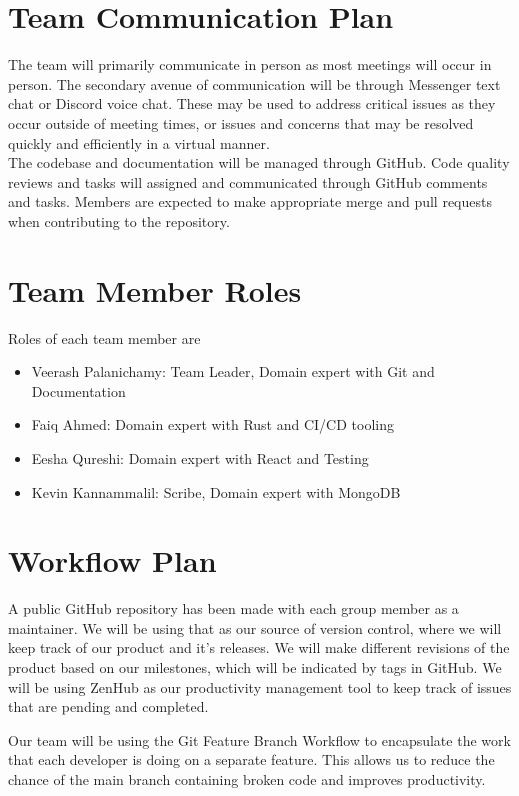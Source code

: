 \documentclass{article}
\begin{document}
\section{Team Communication Plan}

	The team will primarily communicate in person as most meetings will occur in person. The secondary avenue of communication will be through Messenger text chat or Discord voice chat. These may be used to address critical issues as they occur outside of meeting times, or issues and concerns that may be resolved quickly and efficiently in a virtual manner. \\
	The codebase and documentation will be managed through GitHub. Code quality reviews and tasks will assigned and communicated through GitHub comments and tasks. Members are expected to make appropriate merge and pull requests when contributing to the repository.

\section{Team Member Roles}
Roles of each team member are
\begin{itemize}
    \item Veerash Palanichamy: Team Leader, Domain expert with Git and Documentation 
    \item Faiq Ahmed: Domain expert with Rust and CI/CD tooling
    \item Eesha Qureshi: Domain expert with React and Testing
    \item Kevin Kannammalil: Scribe, Domain expert with MongoDB
\end{itemize}

\section{Workflow Plan}

A public GitHub repository has been made with each group member as a maintainer. We will be using that as our source of version control, where we will keep track of our product and it's releases. We will make different revisions of the product based on our milestones, which will be indicated by tags in GitHub. We will be using ZenHub as our productivity management tool to keep track of issues that are pending and completed. 

Our team will be using the Git Feature Branch Workflow to encapsulate the work that each developer is doing on a separate feature. This allows us to reduce the chance of the main branch containing broken code and improves productivity.\\
\end{document}
